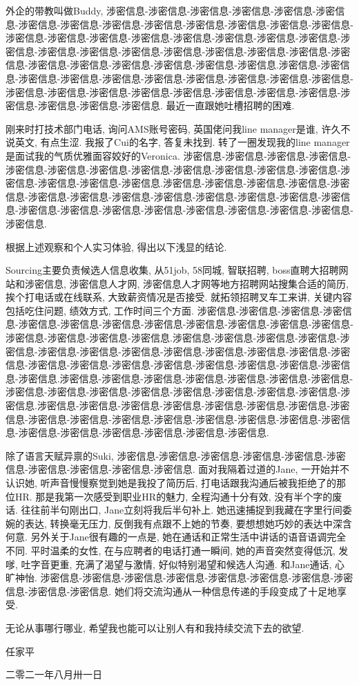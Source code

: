 外企的带教叫做Buddy, 涉密信息-涉密信息-涉密信息-涉密信息-涉密信息-涉密信息-涉密信息-涉密信息-涉密信息-涉密信息-涉密信息-涉密信息-涉密信息-涉密信息-涉密信息-涉密信息-涉密信息-涉密信息-涉密信息-涉密信息-涉密信息-涉密信息-涉密信息-涉密信息-涉密信息-涉密信息-涉密信息-涉密信息-涉密信息-涉密信息-涉密信息-涉密信息-涉密信息-涉密信息-涉密信息-涉密信息-涉密信息.涉密信息-涉密信息-涉密信息-涉密信息-涉密信息-涉密信息-涉密信息-涉密信息-涉密信息-涉密信息-涉密信息-涉密信息-涉密信息-涉密信息-涉密信息-涉密信息-涉密信息-涉密信息-涉密信息-涉密信息-涉密信息-涉密信息. 最近一直跟她吐槽招聘的困难. 

刚来时打技术部门电话, 询问AMS账号密码, 英国佬问我line manager是谁, 许久不说英文, 有点生涩. 我报了Cui的名字, 答复未找到. 转了一圈发现我的line manager是面试我的气质优雅面容姣好的Veronica. 涉密信息-涉密信息-涉密信息-涉密信息-涉密信息-涉密信息-涉密信息-涉密信息-涉密信息-涉密信息-涉密信息-涉密信息-涉密信息-涉密信息-涉密信息-涉密信息.涉密信息-涉密信息-涉密信息-涉密信息-涉密信息-涉密信息-涉密信息-涉密信息-涉密信息-涉密信息-涉密信息-涉密信息-涉密信息-涉密信息-涉密信息-涉密信息-涉密信息-涉密信息-涉密信息-涉密信息-涉密信息-涉密信息.

根据上述观察和个人实习体验, 得出以下浅显的结论.

Sourcing主要负责候选人信息收集, 从51job, 58同城, 智联招聘, boss直聘大招聘网站和涉密信息, 涉密信息人才网, 涉密信息人才网等地方招聘网站搜集合适的简历, 挨个打电话或在线联系, 大致薪资情况是否接受. 就拓领招聘叉车工来讲, 关键内容包括吃住问题, 绩效方式, 工作时间三个方面. 涉密信息-涉密信息-涉密信息-涉密信息-涉密信息-涉密信息-涉密信息-涉密信息-涉密信息-涉密信息-涉密信息-涉密信息-涉密信息-涉密信息-涉密信息-涉密信息.涉密信息-涉密信息-涉密信息-涉密信息-涉密信息-涉密信息-涉密信息-涉密信息-涉密信息-涉密信息-涉密信息-涉密信息-涉密信息-涉密信息-涉密信息-涉密信息-涉密信息-涉密信息-涉密信息-涉密信息-涉密信息-涉密信息.涉密信息-涉密信息-涉密信息-涉密信息-涉密信息-涉密信息-涉密信息-涉密信息-涉密信息-涉密信息-涉密信息-涉密信息-涉密信息-涉密信息-涉密信息-涉密信息.涉密信息-涉密信息-涉密信息-涉密信息-涉密信息-涉密信息-涉密信息-涉密信息-涉密信息-涉密信息-涉密信息-涉密信息-涉密信息-涉密信息-涉密信息-涉密信息-涉密信息-涉密信息-涉密信息-涉密信息-涉密信息-涉密信息.

除了语言天赋异禀的Suki, 涉密信息-涉密信息-涉密信息-涉密信息-涉密信息-涉密信息-涉密信息-涉密信息-涉密信息-涉密信息. 面对我隔着过道的Jane, 一开始并不认识她, 听声音慢慢察觉到她是我投了简历后, 打电话跟我沟通后被我拒绝了的那位HR. 那是我第一次感受到职业HR的魅力, 全程沟通十分有效, 没有半个字的废话. 往往前半句刚出口, Jane立刻将我后半句补上. 她迅速捕捉到我藏在字里行间委婉的表达, 转换毫无压力, 反倒我有点跟不上她的节奏, 要想想她巧妙的表达中深含何意. 另外关于Jane很有趣的一点是, 她在通话和正常生活中讲话的语音语调完全不同. 平时温柔的女性, 在与应聘者的电话打通一瞬间, 她的声音突然变得低沉, 发嗲, 吐字音更重, 充满了渴望与激情, 好似特别渴望和候选人沟通. 和Jane通话, 心旷神怡. 涉密信息-涉密信息-涉密信息-涉密信息-涉密信息-涉密信息-涉密信息-涉密信息-涉密信息-涉密信息. 她们将交流沟通从一种信息传递的手段变成了十足地享受. 

无论从事哪行哪业, 希望我也能可以让别人有和我持续交流下去的欲望.

\begin{flushright}
    \bfseries

    任家平

    二零二一年八月卅一日
\end{flushright}